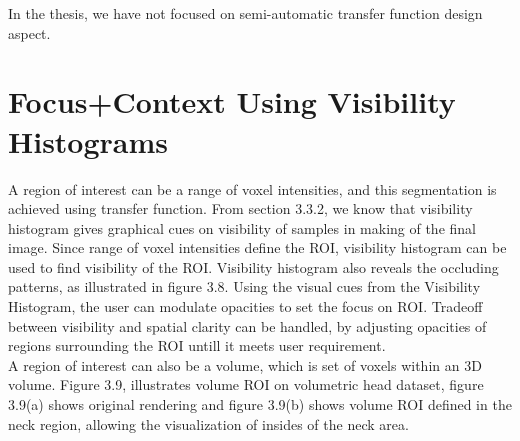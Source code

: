In the thesis, we have not focused on semi-automatic transfer function design aspect. 

\section{Focus+Context Using Visibility Histograms}

A region of interest can be a range of voxel intensities, and this segmentation is achieved using transfer function. From section 3.3.2, we know that visibility histogram gives graphical cues on visibility of samples in making of the final image. Since range of voxel intensities define the ROI, visibility histogram can be used to find visibility of the ROI. Visibility histogram also reveals the occluding patterns, as illustrated in figure 3.8. Using the visual cues from the Visibility Histogram, the user can modulate opacities to set the focus on ROI. Tradeoff between visibility and spatial clarity can be handled, by adjusting opacities of regions surrounding the ROI untill it meets user requirement. \\

A region of interest can also be a volume, which is set of voxels within an 3D volume. Figure 3.9, illustrates volume ROI on volumetric head dataset, figure 3.9(a) shows original rendering and figure 3.9(b) shows volume ROI defined in the neck region, allowing the visualization of insides of the neck area.


